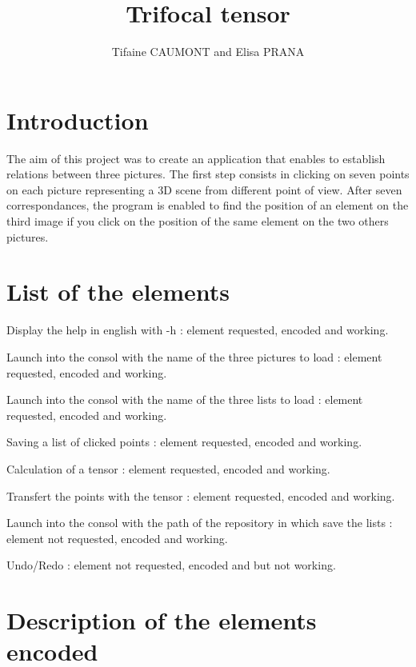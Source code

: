 \documentclass{report}
\begin{document}
\title{Trifocal tensor}
\author{Tifaine CAUMONT and Elisa PRANA}
\maketitle

\tableofcontents
\newpage

\section{Introduction}
The aim of this project was to create an application that enables to establish relations between three pictures. The first step consists in clicking on seven points on each picture representing a 3D scene from different point of view. After seven correspondances, the program is enabled to find the position of an element on the third image if you click on the position of the same element on the two others pictures. 

\section{List of the elements}
\begin{list}{•}{•}
\item 
Display the help in english with -h : element requested, encoded and working.  
\item
Launch into the consol with the name of the three pictures to load : element requested, encoded and working. 
\item
Launch into the consol with the name of the three lists to load : element requested, encoded and working. 
\item
Saving a list of clicked points : element requested, encoded and working.  
\item
Calculation of a tensor : element requested, encoded and working. 
\item
Transfert the points with the tensor : element requested, encoded and working.
\item 
Launch into the consol with the path of the repository in which save the lists : element not requested, encoded and working.  
\item 
Undo/Redo : element not requested, encoded and but not working.  

\end{list}

\section{Description of the elements encoded}
\end{document}
